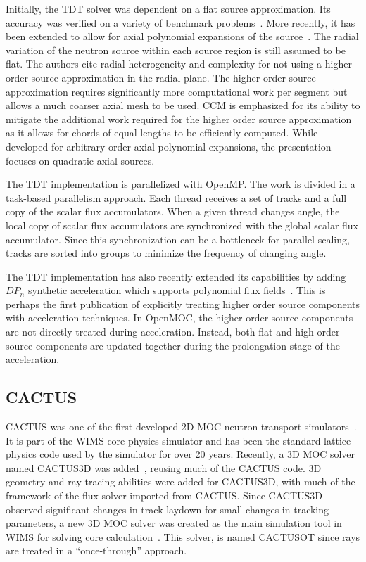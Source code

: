 Initially, the TDT solver was dependent on a flat source approximation. Its accuracy was verified on a variety of benchmark problems~\cite{apollo3_3dmoc, apollo3_vv}. More recently, it has been extended to allow for axial polynomial expansions of the source~\cite{apollo3_extruded}. The radial variation of the neutron source within each source region is still assumed to be flat. The authors cite radial heterogeneity and complexity for not using a higher order source approximation in the radial plane. The higher order source approximation requires significantly more computational work per segment but allows a much coarser axial mesh to be used. \ac{CCM} is emphasized for its ability to mitigate the additional work required for the higher order source approximation as it allows for chords of equal lengths to be efficiently computed. While developed for arbitrary order axial polynomial expansions, the presentation focuses on quadratic axial sources.

The TDT implementation is parallelized with OpenMP. The work is divided in a task-based parallelism approach. Each thread receives a set of tracks and a full copy of the scalar flux accumulators. When a given thread changes angle, the local copy of scalar flux accumulators are synchronized with the global scalar flux accumulator. Since this synchronization can be a bottleneck for parallel scaling, tracks are sorted into groups to minimize the frequency of changing angle.

The TDT implementation has also recently extended its capabilities by adding $DP_n$ synthetic acceleration which supports polynomial flux fields~\cite{apollo3_exp}. This is perhaps the first publication of explicitly treating higher order source components with acceleration techniques. In OpenMOC, the higher order source components are not directly treated during acceleration. Instead, both flat and high order source components are updated together during the prolongation stage of the acceleration.

\subsection{CACTUS}
\label{sec:cactus}

CACTUS was one of the first developed 2D \ac{MOC} neutron transport simulators~\cite{cactus_2d}. It is part of the WIMS core physics simulator and has been the standard lattice physics code used by the simulator for over 20 years. Recently, a 3D \ac{MOC} solver named CACTUS3D was added~\cite{cactus_3d}, reusing much of the CACTUS code. 3D geometry and ray tracing abilities were added for CACTUS3D, with much of the framework of the flux solver imported from CACTUS. Since CACTUS3D observed significant changes in track laydown for small changes in tracking parameters, a new 3D \ac{MOC} solver was created as the main simulation tool in WIMS for solving core calculation~\cite{cactus_wims}. This solver, is named  CACTUSOT since rays are treated in a ``once-through'' approach.

